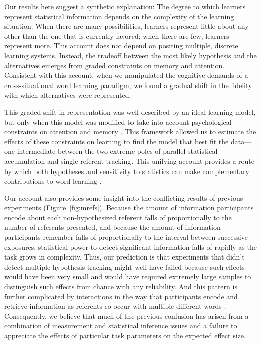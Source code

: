 \documentclass[man,floatsintext]{apa6}
\begin{document}
Our results here suggest a synthetic explanation: The degree to which learners represent statistical information depends on the complexity of the learning situation. When there are many possibilities, learners represent little about any other than the one that is currently favored; when there are few, learners represent more. This account does not depend on positing multiple, discrete learning systems. Instead, the tradeoff between the most likely hypothesis and the alternatives emerges from graded constraints on memory and attention. Consistent with this account, when we manipulated the cognitive demands of a cross-situational word learning paradigm, we found a gradual shift in the fidelity with which alternatives were represented.

This graded shift in representation was well-described by an ideal learning model, but only when this model was modified to take into account psychological constraints on attention and memory \cite{Kachergis2012,Vlach2013,Yurovsky2014}. This framework allowed us to estimate the effects of these constraints on learning to find the model that best fit the data---one intermediate between the two extreme poles of parallel statistical accumulation and single-referent tracking. This unifying account provides a route by which both hypotheses and sensitivity to statistics can make complementary contributions to word learning \cite{Waxman2009,Kachergis2013}. 

Our account also provides some insight into the conflicting results of previous experiments (Figure~\ref{fig:mrefs}). Because the amount of information participants encode about each non-hypothesized referent falls of proportionally to the number of referents presented, and because the amount of information participants remember falls of proportionally to the interval between successive exposures, statistical power to detect significant information falls of rapidly as the task grows in complexity. Thus, our prediction is that experiments that didn't detect multiple-hypothesis tracking might well have failed because such effects would have been very small and would have required extremely large samples to distinguish such effects from chance with any reliability. And this pattern is further complicated by interactions in the way that participants encode and retrieve information as referents co-occur with multiple different words \cite{Yurovsky2013, Yurovsky2014}. Consequently, we believe that much of the previous confusion has arisen from a combination of measurement and statistical inference issues and a failure to appreciate the effects of particular task parameters on the expected effect size.
\end{document}
